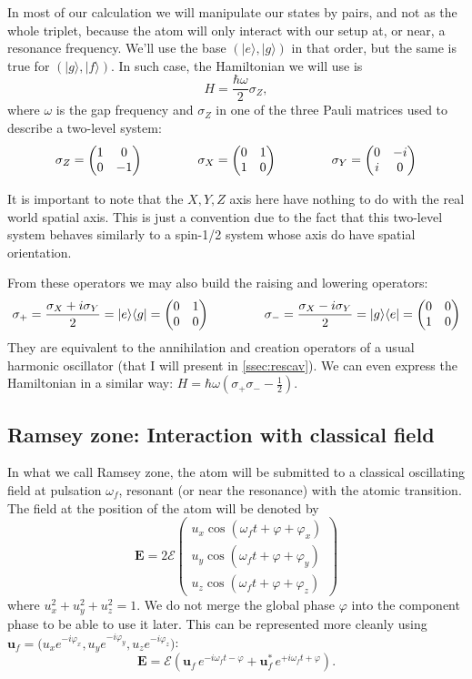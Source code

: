 \documentclass[10pt,a4paper]{report}
\theoremstyle{plain}
\theoremstyle{definition}
\theoremstyle{remark}
\newcommand{\ket}[1]{|#1\rangle}
\newcommand{\bra}[1]{\langle#1|}
\newcommand{\mat}[1]{\begin{pmatrix}#1\end{pmatrix}}
\newcommand{\bs}{\boldsymbol}
\newcommand{\gap}{\hspace{1.5cm}}
\newcommand{\twoline}{\vphantom{\frac\int\int}}
\begin{document}
In most of our calculation we will manipulate our states by pairs, and not as the
whole triplet, because the atom will only interact with our setup at, or near,
a resonance frequency. We'll use the base $(\ket e, \ket g)$ in that order, but
the same is true for $(\ket g, \ket f)$. In such case, the Hamiltonian we will
use is
\[H = \frac {\hbar \omega}2 \sigma_Z,\]
 where $\omega$ is the gap frequency and $\sigma_Z$ in one of the
 three Pauli matrices used to describe a two-level system:
\[\twoline \sigma_Z = \mat{1&0\\0&-1} \gap \sigma_X = \mat{0&1\\1&0} \gap
  \sigma_Y = \mat{0&-i\\i&0}\]

It is important to note that the $X,Y,Z$ axis here have nothing to do with the
real world spatial axis. This is just a convention due to the fact that
this two-level system behaves similarly to a spin-1/2 system whose axis do have
spatial orientation.

From these operators we may also build the raising and lowering operators:
\[\sigma_+ = \frac{\sigma_X + i \sigma_Y}2 = \ket e \bra g = \mat{0&1\\0&0}
  \gap
  \sigma_- = \frac{\sigma_X - i \sigma_Y}2 = \ket g \bra e= \mat{0&0\\1&0}\]
They are equivalent to the annihilation and creation operators of a usual
harmonic oscillator (that I will present in \cref{ssec:rescav}). We can even
express the Hamiltonian in a similar way: $H = \hbar \omega(\sigma_+\sigma_- -
\frac12)$.





\subsection{Ramsey zone: Interaction with classical field}\label{sec:ramsey}


In what we call Ramsey zone, the atom will be submitted to a classical oscillating
field at pulsation $\omega_f$, resonant (or near the resonance) with the atomic
transition. The field at the position of the atom will
be denoted by
\[\bs E = 2\mathcal{E}
  \mat{u_x\cos(\omega_f t + \varphi + \varphi_x)\\
    u_y\cos(\omega_f t + \varphi + \varphi_y)\\
    u_z\cos(\omega_f t + \varphi + \varphi_z)}\]
where $u_x^2 + u_y^2 +u_z^2 = 1$. We do not merge the global phase $\varphi$ into
the component phase to be able to use it later. This can be represented more
cleanly using $\bs u_f = \big(u_x e^{-i\varphi_x},u_y e^{-i\varphi_y},u_z
e^{-i\varphi_z}\big)$:
\begin{equation}\label{eqn:field}
\bs E = \mathcal{E} (\bs u_f\, e^{-i\omega_f t-\varphi} + \bs u_f^*\,
  e^{+i\omega_f t + \varphi}).
\end{equation}
\end{document}
